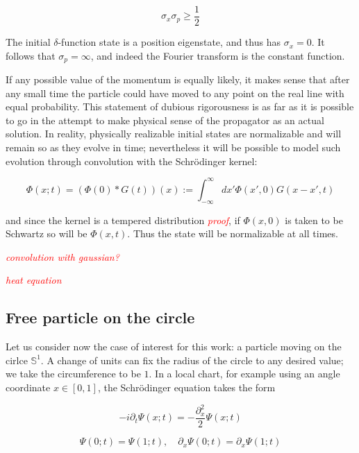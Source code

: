 \documentclass{article}
\newcommand{\ess}{\ensuremath{\mathbb{S}}}
\newcommand{\cmnt}[1]{\textcolor{red}{\emph{#1}}}
\newcommand{\intR}{\int_{-\infty}^\infty}
\begin{document}
\begin{equation}
    \sigma_x \sigma_p \geq \frac{1}{2}
\end{equation}

The initial $\delta$-function state is a position eigenstate, and thus has $\sigma_x = 0$. It follows that $\sigma_p = \infty$, and indeed the Fourier transform is the constant function.

If any possible value of the momentum is equally likely, it makes sense that after any small time the particle could have moved to any point on the real line with equal probability. This statement of dubious rigorousness is as far as it is possible to go in the attempt to make physical sense of the propagator as an actual solution. In reality, physically realizable initial states are normalizable and will remain so as they evolve in time; nevertheless it will be possible to model such evolution through convolution with the Schr\"odinger kernel:

\begin{equation}
    \Phi(x;t) = \left(\Phi(0) * G(t) \right)(x) := \intR dx' \Phi(x',0) G(x-x',t)
\end{equation}

and since the kernel is a tempered distribution \cmnt{proof}, if $\Phi(x,0)$ is taken to be Schwartz so will be $\Phi(x,t)$. Thus the state will be normalizable at all times.

\cmnt{convolution with gaussian?}

\cmnt{heat equation}

\subsection{Free particle on the circle}

Let us consider now the case of interest for this work: a particle moving on the cirlce $\ess^1$. A change of units can fix the radius of the circle to any desired value; we take the circumference to be $1$. In a local chart, for example using an angle coordinate $x \in [0,1]$, the Schr\"odinger equation takes the form

\begin{equation}
    -i\partial_t \Psi(x;t) = - \frac{\partial_x^2}{2} \Psi(x;t)
\end{equation}

\begin{equation}    
    \label{boundaryconds}
    \Psi(0;t) = \Psi(1;t), \quad \partial_x \Psi(0;t) = \partial_x \Psi(1;t)
\end{equation}
\end{document}
